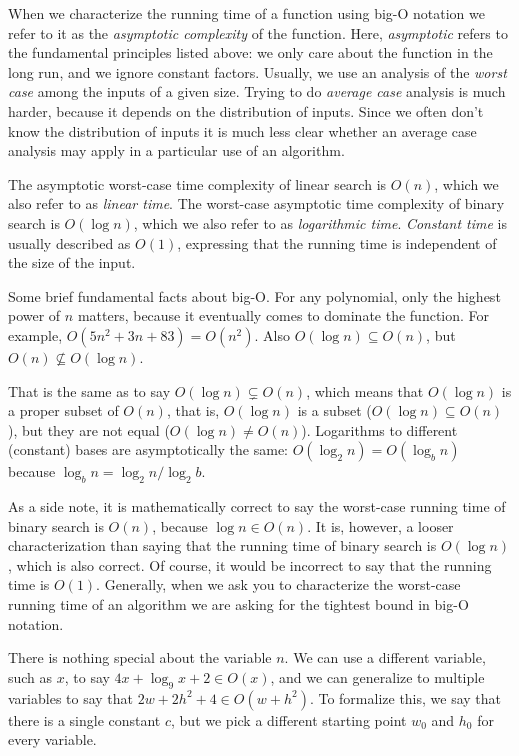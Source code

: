 When we characterize the running time of a function using big-O
notation we refer to it as the \emph{asymptotic complexity} of the
function.  Here, \emph{asymptotic} refers to the fundamental
principles listed above: we only care about the function in the long
run, and we ignore constant factors.  Usually, we use an analysis of
the \emph{worst case} among the inputs of a given size.  Trying to do
\emph{average case} analysis is much harder, because it depends on the
distribution of inputs.  Since we often don't know the distribution of
inputs it is much less clear whether an average case analysis may
apply in a particular use of an algorithm.

The asymptotic worst-case time complexity of linear search is $O(n)$,
which we also refer to as \emph{linear time}.  The worst-case
asymptotic time complexity of binary search is $O(\log n)$,
which we also refer to as \emph{logarithmic time}. \emph{Constant
  time} is usually described as $O(1)$, expressing that the running
time is independent of the size of the input.

Some brief fundamental facts about big-O.  For any polynomial, only
the highest power of $n$ matters, because it eventually comes to
dominate the function.  For example, $O(5n^2 + 3n + 83) = O(n^2)$.
Also $O(\log n) \subseteq O(n)$, but $O(n) \not\subseteq
O(\log n)$.

That is the same as to say $O(\log n) \subsetneq O(n)$, which
means that $O(\log n)$ is a proper subset of $O(n)$, that is,
$O(\log n)$ is a subset ($O(\log n) \subseteq
O(n)$), but they are not equal ($O(\log n) \neq O(n)$).
Logarithms to different (constant) bases are asymptotically the same:
$O(\log_2 n) = O(\log_b n)$ because
$\log_b n = \log_2 n / \log_2 b$.

As a side note, it is mathematically correct to say the worst-case
running time of binary search is $O(n)$, because $\log n \in
O(n)$.  It is, however, a looser characterization than saying that the
running time of binary search is $O(\log n)$, which is also
correct.  Of course, it would be incorrect to say that the running
time is $O(1)$.  Generally, when we ask you to characterize the
worst-case running time of an algorithm we are asking for the tightest
bound in big-O notation.

There is nothing special about the variable $n$. We can use a
different variable, such as $x$, to say $4x + \log_9 x + 2 \in O(x)$,
and we can generalize to multiple variables to say that $2w + 2h^2 + 4
\in O(w + h^2)$. To formalize this, we say that there is a single
constant $c$, but we pick a different starting point $w_0$ and $h_0$
for every variable.

